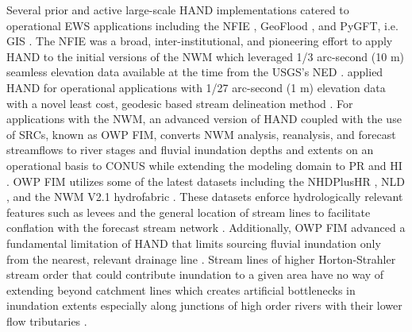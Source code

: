 \documentclass[preprint,review,12pt]{dependencies/elsarticle}
\begin{document}
Several prior and active large-scale \ac{HAND} implementations catered to operational \ac{EWS} applications including the \ac{NFIE} \citep{maidment2017conceptual,liu2016cybergis,liu2018cybergis}, GeoFlood \citep{zheng2018geoflood,hocini2021performance,d2022identification,carruthers2021assessment,zheng2022application}, and \ac{PyGFT}, i.e. \ac{GIS} \citep{petrochenkov2020pygft,verdin2016software}.
The \ac{NFIE} was a broad, inter-institutional, and pioneering effort to apply HAND to the initial versions of the \ac{NWM} which leveraged 1/3 arc-second (10 \ac{m}) seamless elevation data available at the time \citep{maidment2017conceptual,liu2016cybergis,liu2018cybergis} from the \ac{USGS}'s \ac{NED} \citep{gesch2002national,gesch2007digital}.
\citet{zheng2018geoflood} applied HAND for operational applications with 1/27 arc-second (1 \ac{m}) elevation data with a novel least cost, geodesic based stream delineation method \citep{passalacqua2010geometric,passalacqua2012automatic,zheng2018geoflood,zheng2019automatic,carruthers2021assessment,d2022identification,zheng2022application}.
For applications with the \ac{NWM}, an advanced version of \ac{HAND} coupled with the use of \acp{SRC}, known as \ac{OWP} \ac{FIM}, converts \ac{NWM} analysis, reanalysis, and forecast streamflows to river stages and fluvial inundation depths and extents on an operational basis to \ac{CONUS} while extending the modeling domain to \ac{PR} and \ac{HI} \citep{aristizabal2022extending,inundationMapping2022}.
\ac{OWP} \ac{FIM} utilizes some of the latest datasets including the \ac{NHDPlusHR} \citep{moore2019user}, \ac{NLD} \citep{engineers2016national}, and the \ac{NWM} \ac{V2.1} hydrofabric \citep{water2022nwm,noaa2016national,nwm2022hydrofabric,gochis2021wrf}.
These datasets enforce hydrologically relevant features such as levees and the general location of stream lines to facilitate conflation with the forecast stream network \citep{aristizabal2022extending,inundationMapping2022}.
Additionally, \ac{OWP} \ac{FIM} advanced a fundamental limitation of \ac{HAND} that limits sourcing fluvial inundation only from the nearest, relevant drainage line \citep{mcgehee2016modified,aristizabal2022extending,zhang2018comparative,li2022comparative,zheng2018geoflood,zheng2018river,nobre2016hand}.
Stream lines of higher Horton-Strahler stream order that could contribute inundation to a given area have no way of extending beyond catchment lines which creates artificial bottlenecks in inundation extents especially along junctions of high order rivers with their lower flow tributaries \citep{aristizabal2022extending,mcgehee2016modified}.
\end{document}
